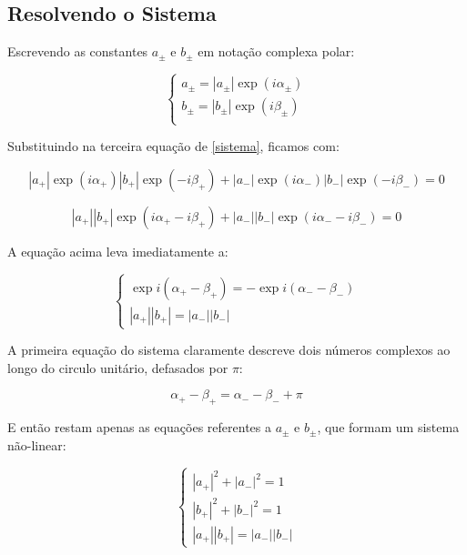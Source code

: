\documentclass[12pt,a4paper]{report}
\begin{document}
\subsection{Resolvendo o Sistema}

Escrevendo as constantes $a_{\pm}$ e $b_{\pm}$ em notação complexa polar:

\begin{equation}
\begin{cases}
    a_{\pm} = |a_{\pm}|\exp(i\alpha_{\pm})\\[0.3cm]
    b_{\pm} = |b_{\pm}|\exp(i\beta_{\pm})\\
\end{cases}
\end{equation}

Substituindo na terceira equação de \ref{sistema}, ficamos com:

\begin{equation*}
    |a_{+}|\exp(i\alpha_{+})|b_{+}|\exp(-i\beta_{+})+|a_{-}|\exp(i\alpha_{-})|b_{-}|\exp(-i\beta_{-})=0
\end{equation*}

\begin{equation*}
    |a_{+}||b_{+}|\exp(i\alpha_{+}-i\beta_{+})+|a_{-}||b_{-}|\exp(i\alpha_{-}-i\beta_{-})=0
\end{equation*}

A equação acima leva imediatamente a:

\begin{equation}
\begin{cases}
    \exp{i(\alpha_{+}-\beta_{+})} = -\exp{i(\alpha_{-}-\beta_{-})}\\[0.3cm]
    |a_{+}||b_{+}|=|a_{-}||b_{-}|
\end{cases}
\end{equation}

A primeira equação do sistema claramente descreve dois números complexos ao longo do circulo unitário, defasados por $\pi$:

\begin{equation}
    \boxed{\alpha_{+}-\beta_{+}=\alpha_{-}-\beta_{-}+\pi}
    \label{phase.shift}
\end{equation}

E então restam apenas as equações referentes a $a_{\pm}$ e $b_{\pm}$, que formam um sistema não-linear:

\begin{equation}
\begin{cases}
    |a_{+}|^2+|a_{-}|^2=1\\[0.3cm]
    |b_{+}|^2+|b_{-}|^2=1\\[0.3cm]
    |a_{+}||b_{+}|=|a_{-}||b_{-}|
\end{cases}
\end{equation}\\
\end{document}
